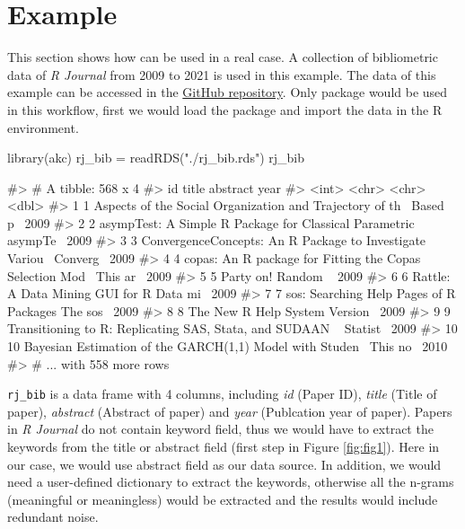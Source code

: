 \hypertarget{example}{%
\section{Example}\label{example}}

This section shows how  can be used in a real case. A
collection of bibliometric data of \emph{R Journal} from 2009 to 2021 is
used in this example. The data of this example can be accessed in the
\href{https://github.com/hope-data-science/RJ_akc}{GitHub repository}.
Only  package would be used in this workflow, first we
would load the package and import the data in the R environment.

\begin{Schunk}
\begin{Sinput}
library(akc)
rj_bib = readRDS("./rj_bib.rds")
rj_bib
\end{Sinput}
\begin{Soutput}
#> # A tibble: 568 x 4
#>       id title                                                    abstract  year
#>    <int> <chr>                                                    <chr>    <dbl>
#>  1     1 Aspects of the Social Organization and Trajectory of th~ Based p~  2009
#>  2     2 asympTest: A Simple R Package for Classical Parametric ~ asympTe~  2009
#>  3     3 ConvergenceConcepts: An R Package to Investigate Variou~ Converg~  2009
#>  4     4 copas: An R package for Fitting the Copas Selection Mod~ This ar~  2009
#>  5     5 Party on!                                                Random ~  2009
#>  6     6 Rattle: A Data Mining GUI for R                          Data mi~  2009
#>  7     7 sos: Searching Help Pages of R Packages                  The sos~  2009
#>  8     8 The New R Help System                                    Version~  2009
#>  9     9 Transitioning to R: Replicating SAS, Stata, and SUDAAN ~ Statist~  2009
#> 10    10 Bayesian Estimation of the GARCH(1,1) Model with Studen~ This no~  2010
#> # ... with 558 more rows
\end{Soutput}
\end{Schunk}

\texttt{rj\_bib} is a data frame with 4 columns, including \emph{id}
(Paper ID), \emph{title} (Title of paper), \emph{abstract} (Abstract of
paper) and \emph{year} (Publcation year of paper). Papers in \emph{R
Journal} do not contain keyword field, thus we would have to extract the
keywords from the title or abstract field (first step in Figure
\ref{fig:fig1}). Here in our case, we would use abstract field as our
data source. In addition, we would need a user-defined dictionary to
extract the keywords, otherwise all the n-grams (meaningful or
meaningless) would be extracted and the results would include redundant
noise.

